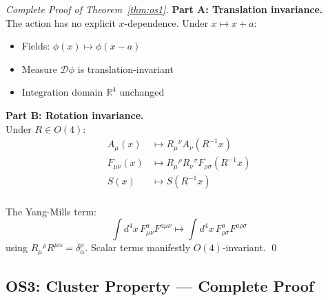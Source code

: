 \documentclass[11pt,a4paper]{article}
\providecommand{\R}{\mathbb{R}}
\theoremstyle{plain}
\theoremstyle{definition}
\begin{document}
\begin{proof}[Complete Proof of Theorem~\ref{thm:os1}]
\textbf{Part A: Translation invariance.}
\vspace{0.3em}\\
The action has no explicit $x$-dependence. Under $x \mapsto x + a$:
\begin{itemize}
\item Fields: $\phi(x) \mapsto \phi(x-a)$
\item Measure $\mathcal{D}\phi$ is translation-invariant
\item Integration domain $\R^4$ unchanged
\end{itemize}
\vspace{0.3em}
\textbf{Part B: Rotation invariance.}
\vspace{0.3em}\\
Under $R \in O(4)$:
\begin{align}
A_\mu(x) &\mapsto R_\mu{}^\nu A_\nu(R^{-1}x) \\
F_{\mu\nu}(x) &\mapsto R_\mu{}^\rho R_\nu{}^\sigma F_{\rho\sigma}(R^{-1}x) \\
S(x) &\mapsto S(R^{-1}x)
\end{align}
\vspace{0.3em}\\
The Yang-Mills term:
\begin{equation}
\int d^4x\, F^a_{\mu\nu}F^{a\mu\nu} \mapsto \int d^4x\, F^a_{\rho\sigma}F^{a\rho\sigma}
\end{equation}
using $R_\mu{}^\rho R^{\mu\alpha} = \delta^\rho_\alpha$. Scalar terms manifestly $O(4)$-invariant. \qed
\end{proof}
\newpage
\subsection{OS3: Cluster Property --- Complete Proof}
\end{document}
